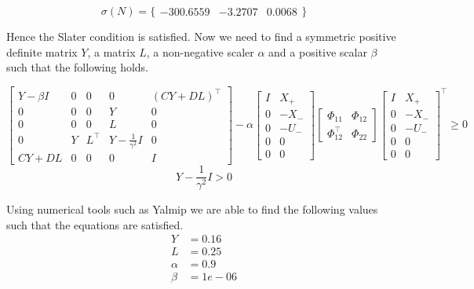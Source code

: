 \begin{equation*}
\sigma(N) = \{ \begin{array}{ccc}
	-300.6559 & -3.2707 & 0.0068
\end{array} \}
\end{equation*}

Hence the Slater condition is satisfied. Now we need to find a symmetric positive definite matrix $Y$, a matrix $L$, a non-negative scaler $\alpha$ and a positive scalar $\beta$ such that the following holds.

\begin{equation*}
	\begin{bmatrix}
		Y - \beta I & 0 & 0 & 0 & (CY + DL)^\top \\
		0 & 0 & 0 & Y & 0 \\
		0 & 0 & 0 & L & 0 \\
		0 & Y & L^\top & Y - \frac{1}{\gamma^2}I & 0 \\
	CY + DL & 0 & 0 & 0 & I
	\end{bmatrix} - \alpha
	\begin{bmatrix} I&X_+ \\ 0 & -X_- \\ 0&-U_- \\ 0&0 \\ 0&0 \end{bmatrix}
	\begin{bmatrix} \Phi_{11} & \Phi_{12} \\ \Phi_{12}^\top & \Phi_{22} \end{bmatrix}
	\begin{bmatrix} I&X_+ \\ 0 & -X_- \\ 0&-U_- \\ 0&0 \\ 0&0 \end{bmatrix}^\top \geq 0
\end{equation*}
\begin{equation*}
	Y - \frac{1}{\gamma^2}I > 0
\end{equation*}

Using numerical tools such as Yalmip we are able to find the following values such that the equations are satisfied.
\begin{align*}
	Y      &= 0.16\\
	L      &= 0.25\\
	\alpha &= 0.9\\
	\beta  &= 1e-06
\end{align*}

